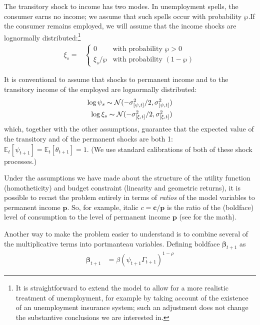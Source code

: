 \documentclass{article}
\newcommand{\CRRA}{\rho}
\newcommand{\pLvl}{\mathbf{p}}
\newcommand{\DiscFac}{\beta}
\newcommand{\cLvl}{\mathbf{c}}
\newcommand{\Ex}{\mathbb{E}}
\newcommand{\permGroFac}{\Gamma}
\newcommand{\permShk}{\psi}
\newcommand{\pZero}{\wp}
\newcommand{\tranShkEmp}{\xi}
\newcommand{\tranShk}{\theta}
\newcommand{\cNrm}{c}
\newcommand{\Rfree}{\mathsf{R}}
\newcommand{\RNrm}{\mathcal{R}}
\begin{document}
The transitory shock to income has two modes. In unemployment spells, the consumer earns no income; we assume that such spells occur with probability $\pZero$.If the consumer remains employed, we will assume that the income shocks are lognormally distributed:\footnote{It is straightforward to extend the model to allow for a more realistic treatment of unemployment, for example by taking account of the existence of an unemployment insurance system; such an adjustment does not change the substantive conclusions we are interested in.}
\begin{align}
    \tranShkEmp_{s} = &
    \begin{cases}
        0\phantom{/\pZero} & \text{with probability $\pZero>0$}
        \\ \xi_{s}/\pZero & \text{with probability $(1-\pZero)$}
    \end{cases}
\end{align}

It is conventional to assume that shocks to permanent income and to the transitory income of the employed are lognormally distributed:
\begin{align}
    \log \permShk_{s} \thicksim \mathcal{N}(-\sigma_{[\permShk, t]}^{2}/2,\sigma_{[\permShk, t]}^{2})
    \\ \log \xi_{s}\thicksim \mathcal{N}(-\sigma_{[\xi, t]}^{2}/2,\sigma_{[\xi, t]}^{2})
\end{align}
which, together with the other assumptions, guarantee that the expected value of the transitory and of the permanent shocks are both 1: $\Ex_{t}[\permShk_{t+1}]=\Ex_{t}[\tranShk_{t+1}]=1$. (We use standard calibrations of both of these shock processes.)

Under the assumptions we have made about the structure of the utility function (homotheticity) and budget constraint (linearity and geometric returns), it is possible to recast the problem entirely in terms of \textit{ratios} of the model variables to permanent income $\pLvl$. So, for example, italic $\cNrm = \cLvl/\pLvl$ is the ratio of the (boldface) level of consumption to the level of permanent income $\pLvl$ (see \cite{BufferStockTheory} for the math).

Another way to make the problem easier to understand is to combine several of the multiplicative terms into portmanteau variables. Defining boldface $\pmb{\DiscFac}_{t+1}$ as
\begin{align}
     \pmb{\DiscFac}_{t+1} & ={\beta} (\permShk_{t+1} \permGroFac_{t+1})^{1-\CRRA}
\end{align}
\end{document}
